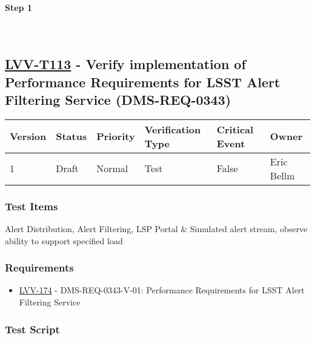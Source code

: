\textbf{Step 1}\\
~\\
~\\

\hypertarget{lvv-t113---verify-implementation-of-performance-requirements-for-lsst-alert-filtering-service-dms-req-0343}{%
\subsection{\texorpdfstring{\href{https://jira.lsstcorp.org/secure/Tests.jspa\#/testCase/LVV-T113}{LVV-T113}
- Verify implementation of Performance Requirements for LSST Alert
Filtering Service
(DMS-REQ-0343)}{LVV-T113 - Verify implementation of Performance Requirements for LSST Alert Filtering Service (DMS-REQ-0343)}}\label{lvv-t113---verify-implementation-of-performance-requirements-for-lsst-alert-filtering-service-dms-req-0343}}

\begin{longtable}[]{@{}llllll@{}}
\toprule
Version & Status & Priority & Verification Type & Critical Event &
Owner\tabularnewline
\midrule
\endhead
1 & Draft & Normal & Test & False & Eric Bellm\tabularnewline
\bottomrule
\end{longtable}

\hypertarget{test-items-13}{%
\subsubsection{Test Items}\label{test-items-13}}

Alert Distribution, Alert Filtering, LSP Portal \& Simulated alert
stream, observe ability to support specified load

\hypertarget{requirements-13}{%
\subsubsection{Requirements}\label{requirements-13}}

\begin{itemize}
\tightlist
\item
  \href{https://jira.lsstcorp.org/browse/LVV-174}{LVV-174} -
  DMS-REQ-0343-V-01: Performance Requirements for LSST Alert Filtering
  Service
\end{itemize}

\hypertarget{test-script-13}{%
\subsubsection{Test Script}\label{test-script-13}}

